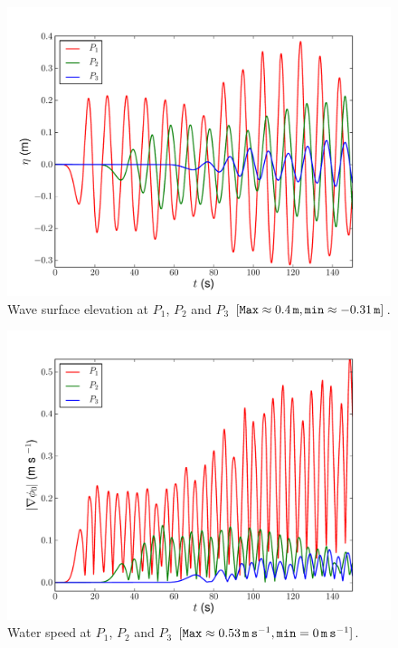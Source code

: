 \begin{figure}
  \begin{center}
    \includegraphics[width=\largefig]{chapters/lopes/pdf/etaprofile.pdf}
  \end{center}
  \caption{Wave surface elevation at $P_1$, $P_2$ and $P_3$ $[{\tt
      Max}\approx 0.4\, {\tt m}, {\tt min}\approx-0.31\,{\tt
      m}]$.}
  \label{fig:lopes:etap}
\end{figure}

\begin{figure}
  \begin{center}
    \includegraphics[width=\largefig]{chapters/lopes/pdf/velprofile.pdf}
  \end{center}
  \caption{Water speed at $P_1$, $P_2$ and $P_3$ $[{\tt Max}\approx
    0.53\, {\tt m\, s}^{-1}, {\tt min}=0\,{\tt m\, s}^{-1}]$.}
  \label{fig:lopes:velp}
\end{figure}

